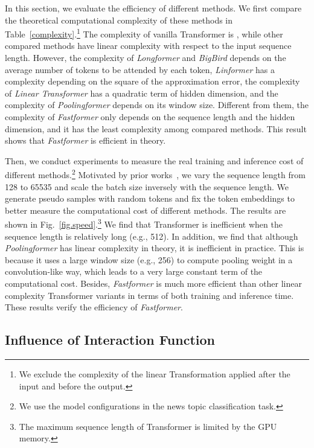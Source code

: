 \documentclass[11pt,a4paper]{article}
\begin{document}
In this section, we evaluate the efficiency of different methods.
We first compare the theoretical computational complexity of these methods in Table~\ref{complexity}.\footnote{We exclude the complexity of the linear Transformation applied after the input and before the output.}
The complexity of vanilla Transformer is , while other compared methods have linear complexity with respect to the input sequence length.
However, the complexity of \textit{Longformer} and \textit{BigBird} depends on the average number of tokens to be attended by each token, \textit{Linformer} has a complexity depending on the square of the approximation error, the complexity of \textit{Linear Transformer} has a quadratic term of hidden dimension, and the complexity of \textit{Poolingformer} depends on its window size.
Different from them, the complexity of \textit{Fastformer} only depends on the sequence length and the hidden dimension, and it has the least complexity among compared methods.
This result shows that \textit{Fastformer} is efficient in theory.

Then, we conduct experiments to measure the real training and inference cost of different methods.\footnote{We use the model configurations in the news topic classification task.}
Motivated by prior works~\cite{katharopoulos2020transformers,wang2020linformer}, we vary the sequence length from 128 to 65535 and scale the batch size inversely with the sequence length.
We generate pseudo samples with random tokens and fix the token embeddings to better measure the computational cost of different methods.
The results are  shown in Fig.~\ref{fig.speed}.\footnote{The maximum sequence length of Transformer is limited by the GPU memory.}
We find that Transformer is inefficient when the sequence length is relatively long (e.g., 512).
In addition, we find that although \textit{Poolingformer} has linear complexity in theory, it is inefficient in practice.
This is because it uses a large window size (e.g., 256) to compute pooling weight in a convolution-like way, which leads to a very large constant term of the computational cost.
Besides, \textit{Fastformer} is much more efficient than other linear complexity Transformer variants in terms of both training and inference time.
These results verify the efficiency of \textit{Fastformer}.







\subsection{Influence of Interaction Function}
\end{document}

